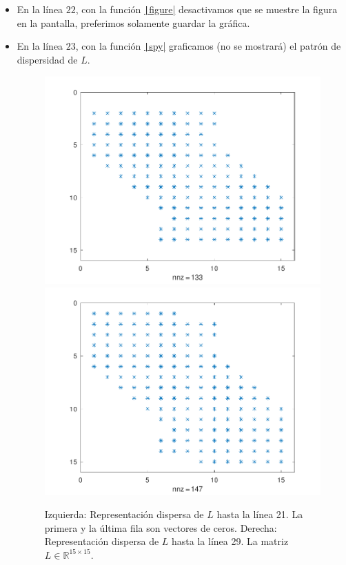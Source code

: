 \begin{problem}
\begin{itemize}
  \item

        En la línea $22$, con la función
        \href{https://docs.octave.org/v9.3.0/Figure-Properties.html#index-figure-visible}{\texttt|figure|}
        desactivamos que se muestre la figura en la pantalla,
        preferimos solamente guardar la gráfica.

  \item

        En la línea $23$, con la función
        \href{https://docs.octave.org/latest/Information.html#index-spy}{\texttt|spy|}
        graficamos (no se mostrará) el patrón de dispersidad de
        $L$.

        \begin{figure}[ht!]
          \centering
          \includegraphics[width=.39\paperwidth]{../examples/octave/elliptic1Dsparsebefore.pdf}
          \includegraphics[width=.39\paperwidth]{../examples/octave/elliptic1Dsparseafter.pdf}
          \caption{Izquierda: Representación dispersa de $L$ hasta la línea
            21.
            La primera y la última fila son vectores de ceros.
            Derecha: Representación dispersa de $L$ hasta la línea 29.
            La matriz $L\in\mathbb{R}^{15\times 15}$.}
        \end{figure}


\end{itemize}
\end{problem}
